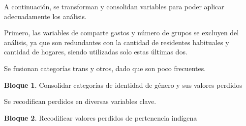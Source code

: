 \documentclass[
]{book}
\newenvironment{Shaded}{\begin{snugshade}}{\end{snugshade}}
\newcommand{\ConstantTok}[1]{\textcolor[rgb]{0.00,0.00,0.00}{#1}}
\newcommand{\DecValTok}[1]{\textcolor[rgb]{0.00,0.00,0.81}{#1}}
\newcommand{\FunctionTok}[1]{\textcolor[rgb]{0.00,0.00,0.00}{#1}}
\newcommand{\NormalTok}[1]{#1}
\newcommand{\OtherTok}[1]{\textcolor[rgb]{0.56,0.35,0.01}{#1}}
\newcommand{\SpecialCharTok}[1]{\textcolor[rgb]{0.00,0.00,0.00}{#1}}
\theoremstyle{definition}
\theoremstyle{definition}
\newtheorem{example}{Bloque}[chapter]
\theoremstyle{definition}
\theoremstyle{definition}
\theoremstyle{remark}
\begin{document}
A continuación, se transforman y consolidan variables para poder aplicar adecuadamente los análisis.

Primero, las variables de comparte gastos y número de grupos se excluyen del análisis, ya que son redundantes con la cantidad de residentes habituales y cantidad de hogares, siendo utilizadas solo estas últimas dos.

Se fusionan categorías trans y otros, dado que son poco frecuentes.

\begin{example}
\protect\hypertarget{exm:bloque29nbm}{}\label{exm:bloque29nbm}Consolidar categorías de identidad de género y sus valores perdidos
\end{example}

\begin{Shaded}
\end{Shaded}

Se recodifican perdidos en diversas variables clave.

\begin{example}
\protect\hypertarget{exm:bloque30nbm}{}\label{exm:bloque30nbm}Recodificar valores perdidos de pertenencia indígena
\end{example}

\begin{Shaded}
\end{Shaded}
\end{document}
